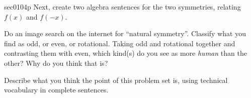 \begin{multicols*}{2}
\begin{exercises}{sec0104p}
\lab[0104LabSentences] Next, create two algebra sentences for the two symmetries, relating $f(x)$
and $f(-x)$.

\vspace{2cm}

\lab[0104LabBeauty] Do an image search on the internet for ``natural symmetry''.  
Classify what you find as odd, or
even, or rotational.  Taking odd and rotational together and contrasting them with even, 
which kind(s) do you see as more \textit{human} than the other?  Why do you think that is?


\vspace{5cm}
\lab[0104LabPoint] Describe what you think the point of this problem set is, 
using technical vocabulary in complete sentences.
\end{exercises}
\end{multicols*}

